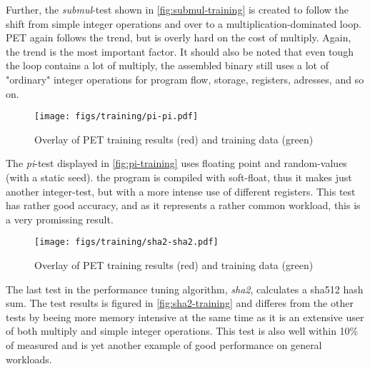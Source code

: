 Further, the \emph{submul}-test shown in \autoref{fig:submul-training} is
created to follow the shift from simple integer operations and over to
a multiplication-dominated loop. PET again follows the trend, but is
overly hard on the cost of multiply. Again, the trend is the most important
factor. It should also be noted that even tough the loop contains a lot of
multiply, the assembled binary still uses a lot of "ordinary" integer
operations for program flow, storage, registers, adresses, and so on.

\begin{figure}[htb]
    \centering
    \texttt{[image: figs/training/pi-pi.pdf]}
    \caption{Overlay of PET training results (red) and training data (green)}
    \label{fig:pi-training}
\end{figure}

The \emph{pi}-test displayed in \autoref{fig:pi-training} uses floating point
and random-values (with a static seed).  the program is compiled with
soft-float, thus it makes just another integer-test, but with a more intense use
of different registers. This test has rather good accuracy, and as it represents
a rather common workload, this is a very promissing result.

\begin{figure}[htb]
    \centering
    \texttt{[image: figs/training/sha2-sha2.pdf]}
    \caption{Overlay of PET training results (red) and training data (green)}
    \label{fig:sha2-training}
\end{figure}

The last test in the performance tuning algorithm, \emph{sha2}, calculates a
sha512 hash sum.  The test results is figured in \autoref{fig:sha2-training} and
differes from the other tests by beeing more memory intensive at the same time
as it is an extensive user of both multiply and simple integer operations. This
test is also well within 10\% of measured and is yet another example of good
performance on general workloads.

